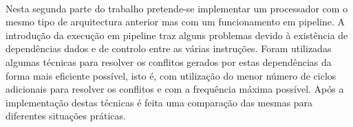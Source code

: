 \paragraph{} 
Nesta segunda parte do trabalho pretende-se implementar um processador com o mesmo tipo de arquitectura anterior mas com um funcionamento em pipeline. A introdução da execução em pipeline traz alguns problemas devido à existência de dependências dados e de controlo entre as várias instruções. Foram utilizadas algumas técnicas para resolver os conflitos gerados por estas dependências da forma mais eficiente possível, isto é, com utilização do menor número de ciclos adicionais para resolver os conflitos e com a frequência máxima possível. Após a implementação destas técnicas é feita uma comparação das mesmas para diferentes situações práticas.
